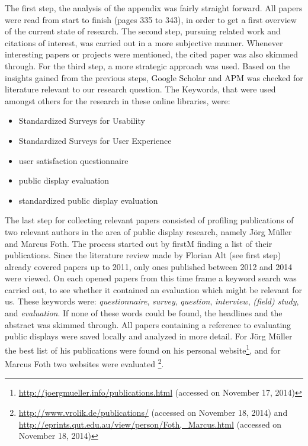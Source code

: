 	The first step, the analysis of the appendix was fairly straight forward. All papers were read from start to finish (pages 335 to 343), in order to get a first overview of the current state of research. 
	The second step, pursuing related work and citations of interest, was carried out in a more subjective manner. Whenever interesting papers or projects were mentioned, the cited paper was also skimmed through. 
	For the third step, a more strategic approach was used. Based on the insights gained from the previous steps, Google Scholar and APM was checked for literature relevant to our research question. The Keywords, that were used amongst others for the research in these online libraries, were:
	\begin{itemize}[itemsep=0pt] 
	\item Standardized Surveys for Usability
	\item Standardized Surveys for User Experience
	\item user satisfaction questionnaire
	\item public display evaluation
	\item standardized public display evaluation
	\end{itemize}

	The last step for collecting relevant papers consisted of profiling publications of two relevant authors in the area of public display research, namely J\"org M\"uller and Marcus Foth. The process started out by firstM finding a list of their publications. Since the literature review made by Florian Alt (see first step) already covered papers up to 2011, only ones published between 2012 and 2014 were viewed. 
	On each opened papers from this time frame a keyword search was carried out, to see whether it contained an evaluation which might be relevant for us. These keywords were: \textit{questionnaire}, \textit{survey}, \textit{question}, \textit{interview}, \textit{(field) study}, and \textit{evaluation}. If none of these words could be found, the headlines and the abstract was skimmed through. All papers containing a reference to evaluating public displays were saved locally and analyzed in more detail.
	For J\"org M\"uller the best list of his publications were found on his personal website\footnote{\url{http://joergmueller.info/publications.html} (accessed on November 17, 2014)}, and for Marcus Foth two websites were evaluated \footnote{\url{http://www.vrolik.de/publications/} (accessed on November 18, 2014) and \url{http://eprints.qut.edu.au/view/person/Foth,_Marcus.html} (accessed on November 18, 2014)}. 

